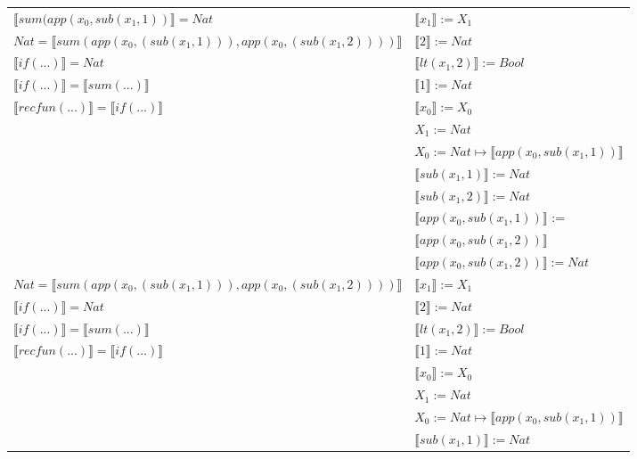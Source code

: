 \begin{exercise}
\begin{description}
\begin{center}
\begin{longtable}[!h]{ | l | l | }
                    \hline 
                        $ \llbracket sum(app(x_0, sub(x_1,1)) \rrbracket = Nat$ & $ \llbracket x_1 \rrbracket := X_1$\\ 
                        $Nat =  \llbracket sum(app(x_0, (sub(x_1,1))), app(x_0, (sub(x_1,2)))) \rrbracket$ & $ \llbracket 2 \rrbracket := Nat$\\
                        $ \llbracket if(...) \rrbracket = Nat$ & $ \llbracket lt(x_1 , 2) \rrbracket := Bool$\\ 
                        $ \llbracket if(...) \rrbracket =  \llbracket sum(...) \rrbracket$ & $ \llbracket 1 \rrbracket := Nat$\\
                        $ \llbracket recfun(...) \rrbracket =  \llbracket if(...) \rrbracket$ & $ \llbracket x_0 \rrbracket := X_0$\\
                        &  $X_1 := Nat$\\ 
                        & $X_0 := Nat \mapsto  \llbracket app(x_0, sub(x_1,1)) \rrbracket$\\
			     & $ \llbracket sub(x_1,1) \rrbracket := Nat$\\
			     & $ \llbracket sub(x_1,2) \rrbracket := Nat$ \\
			     & $ \llbracket app(x_0, sub(x_1,1)) \rrbracket$ := \\
			     & $ \llbracket app(x_0, sub(x_1,2)) \rrbracket$\\ 
			     & $ \llbracket app(x_0, sub(x_1,2)) \rrbracket := Nat$ \\
                    \hline 
                        $Nat =  \llbracket sum(app(x_0, (sub(x_1,1))), app(x_0, (sub(x_1,2)))) \rrbracket$ &  $ \llbracket x_1 \rrbracket := X_1$\\
                        $ \llbracket if(...) \rrbracket = Nat$ & $ \llbracket 2 \rrbracket := Nat$\\
                        $ \llbracket if(...) \rrbracket =  \llbracket sum(...) \rrbracket$ & $ \llbracket lt(x_1 , 2) \rrbracket := Bool$\\
                        $ \llbracket recfun(...) \rrbracket =  \llbracket if(...) \rrbracket$ & $ \llbracket 1 \rrbracket := Nat$\\
                        & $ \llbracket x_0 \rrbracket := X_0$\\ 
                        &  $X_1 := Nat$\\  
			     & $X_0 := Nat \mapsto  \llbracket app(x_0, sub(x_1,1)) \rrbracket$\\
			     & $ \llbracket sub(x_1,1) \rrbracket := Nat$\\

\end{longtable}
\end{center}
\end{description}
\end{exercise}
